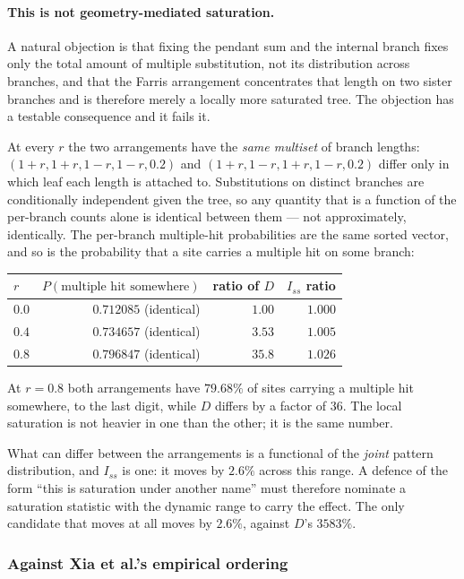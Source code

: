 \documentclass[preprint,12pt,authoryear]{elsarticle}
\newcommand{\Iss}{I_{ss}}
\theoremstyle{definition}
\theoremstyle{remark}
\begin{document}
\paragraph{This is not geometry-mediated saturation.} A natural objection is
that fixing the pendant sum and the internal branch fixes only the total
amount of multiple substitution, not its distribution across branches, and
that the Farris arrangement concentrates that length on two sister branches
and is therefore merely a locally more saturated tree. The objection has a
testable consequence and it fails it.

At every $r$ the two arrangements have the \emph{same multiset} of branch
lengths: $(1+r,1+r,1-r,1-r,0.2)$ and $(1+r,1-r,1+r,1-r,0.2)$ differ only in
which leaf each length is attached to. Substitutions on distinct branches are
conditionally independent given the tree, so any quantity that is a function
of the per-branch counts alone is identical between them --- not
approximately, identically. The per-branch multiple-hit probabilities are
the same sorted vector, and so is the probability that a site carries a
multiple hit on some branch:

\begin{center}
\begin{tabular}{lrrr}
\toprule
$r$ & $P(\text{multiple hit somewhere})$ & ratio of $D$
  & $\Iss$ ratio \\
\midrule
$0.0$ & $0.712085$ (identical) & $1.00$  & $1.000$ \\
$0.4$ & $0.734657$ (identical) & $3.53$  & $1.005$ \\
$0.8$ & $0.796847$ (identical) & $35.8$  & $1.026$ \\
\bottomrule
\end{tabular}
\end{center}

At $r=0.8$ both arrangements have $79.68\%$ of sites carrying a multiple hit
somewhere, to the last digit, while $D$ differs by a factor of $36$. The
local saturation is not heavier in one than the other; it is the same number.

What can differ between the arrangements is a functional of the \emph{joint}
pattern distribution, and $\Iss$ is one: it moves by $2.6\%$ across this
range. A defence of the form ``this is saturation under another name'' must
therefore nominate a saturation statistic with the dynamic range to carry the
effect. The only candidate that moves at all moves by $2.6\%$, against
$D$'s $3583\%$.

\subsubsection{Against Xia et al.'s empirical ordering}
\end{document}
